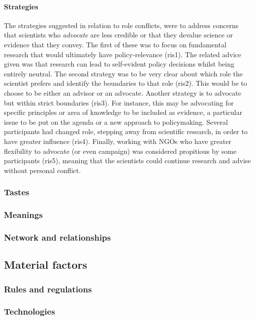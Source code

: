 \paragraph{Strategies}
The strategies suggested in relation to role conflicts, were to address concerns that scientists who \emph{advocate} are less credible or that they devalue science or evidence that they convey. The first of these was to focus on fundamental research that would ultimately have policy-relevance (ris1). The related advice given was that research can lead to self-evident policy decisions whilst being entirely neutral. The second strategy was to be very clear about which role the scientist prefers and identify the boundaries to that role (ris2). This would be to choose to be either an advisor or an advocate. Another strategy is to advocate but within strict boundaries (ris3). For instance, this may be advocating for specific principles or area of knowledge to be included as evidence, a particular issue to be put on the agenda or a new approach to policymaking. Several participants had changed role, stepping away from scientific research, in order to have greater influence (ris4). Finally, working with NGOs who have greater flexibility to advocate (or even campaign) was considered propitious by some participants (ris5), meaning that the scientists could continue research and advise without personal conflict.

\subsubsection{Tastes}\label{sec:restastes}
\subsubsection{Meanings}\label{sec:resmeanings}
\subsubsection{Network and relationships}\label{sec:resnetwork}
\subsection{Material factors}\label{sec:resmaterial}
\subsubsection{Rules and regulations}\label{sec:resrules}
\subsubsection{Technologies}\label{sec:restechnologies}
